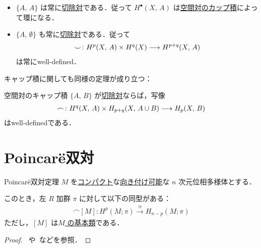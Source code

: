 \documentclass[algtopo_main]{subfiles}
\begin{document}
\begin{marker}
    \begin{itemize}
        \item $\{A,\, A\}$ は常に\hyperref[def:exc-pair]{切除対}である．従って $H^\bullet (X,\, A)$ は\hyperref[thm:relative-cup]{空間対のカップ積}によって環になる．
        \item $\{A,\, \emptyset\}$ も常に\hyperref[def:exc-pair]{切除対}である．従って
        \begin{align}
            \smile \colon H^p(X,\, A) \times H^q(X) \longrightarrow H^{p+q} (X,\, A)
        \end{align}
        は常にwell-defined．
    \end{itemize}
\end{marker}

キャップ積に関しても同様の定理が成り立つ：
\begin{mytheo}[label=thm:relative-cap]{空間対のキャップ積}
    $\{A,\, B\}$ が\hyperref[def:exc-pair]{切除対}ならば，写像
    \begin{align}
        \frown \colon H^q(X,\, A) \times H_{p+q}(X,\, A\cup B) \longrightarrow H_{p} (X,\, B)
    \end{align}
    はwell-definedである．
\end{mytheo}

\section{Poincar\"e双対}


\begin{mytheo}[label=thm:Poincare-dual]{Poincar\"e双対定理}
    $M$ を\underline{コンパクト}な\underline{向き付け可能}な $n$ 次元位相多様体とする．

    このとき，左 $R$ 加群 $\pi$ に対して以下の同型がある：
    \begin{align}
        \frown [M] \colon H^p (M; \pi) \xrightarrow{\cong} H_{n-p} (M; \pi)
    \end{align}
    ただし，$[M]$ は\hyperref[thm:fundamental-class]{$M$ の基本類}である．
\end{mytheo}

\begin{proof}
    ~\cite[p.276]{Milnor}や~\cite[p.241]{Hatcher}などを参照．
\end{proof}
\end{document}
